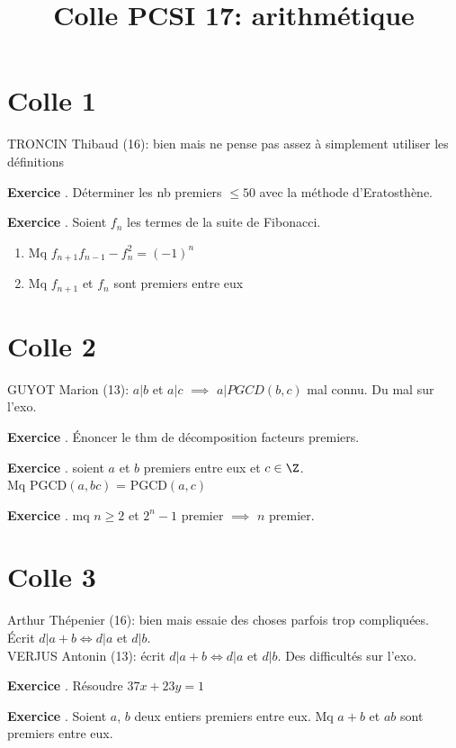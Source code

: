 \documentclass[10pt,a4paper]{article}
\title{Colle PCSI 17: arithmétique}
\newcounter{question}
\newcounter{exo}
\newenvironment{exo}{\vspace{0.5cm}\setcounter{question}{0}\addtocounter{exo}{1} \noindent \textbf{Exercice \theexo}. \normalsize }{\par}
\begin{document}
	\maketitle
\section*{Colle 1}
\setcounter{exo}{0}
	TRONCIN Thibaud (16): bien mais ne pense pas assez à simplement utiliser les définitions \\
	
	
	\begin{exo}
		Déterminer les nb premiers $\leq 50$ avec la méthode d'Eratosthène.
	\end{exo}
	
	\begin{exo}
		Soient $f_n$ les termes de la suite de Fibonacci.
		\begin{enumerate}
			\item Mq $f_{n+1} f_{n-1} - f_n^2 = (-1)^n$
			\item Mq $f_{n+1}$ et $f_n$ sont premiers entre eux
		\end{enumerate}
	\end{exo}

	\section*{Colle 2}
	
	GUYOT Marion (13): $a \vert b$ et $a \vert c$ $\implies$ $a \vert PGCD(b, c)$ mal connu. Du mal sur l'exo.\\
	
	\begin{exo}
		Énoncer le thm de décomposition facteurs premiers.
	\end{exo}
			
	\begin{exo}
		soient $a$ et $b$ premiers entre eux et $c\in  \Z$.\\
		Mq PGCD$(a, bc)$ = PGCD$(a, c)$
	\end{exo}	

	\begin{exo}
		mq $n \geq 2$ et $2^n - 1$ premier $\implies$ $n$ premier.
	\end{exo}	


	\section*{Colle 3}
	\setcounter{exo}{0}
	Arthur Thépenier (16): bien mais essaie des choses parfois trop compliquées. Écrit $d \vert a + b \Longleftrightarrow d \vert a$ et $d \vert b$.\\
	VERJUS Antonin (13): écrit $d \vert a + b \Longleftrightarrow d \vert a$ et $d \vert b$. Des difficultés sur l'exo.
	
	\begin{exo}
		Résoudre $37x+23y = 1$
	\end{exo}
	
	\begin{exo}
		Soient $a$, $b$ deux entiers premiers entre eux. Mq $a+b$ et $ab$ sont premiers entre eux.
	\end{exo}
	
\end{document}
